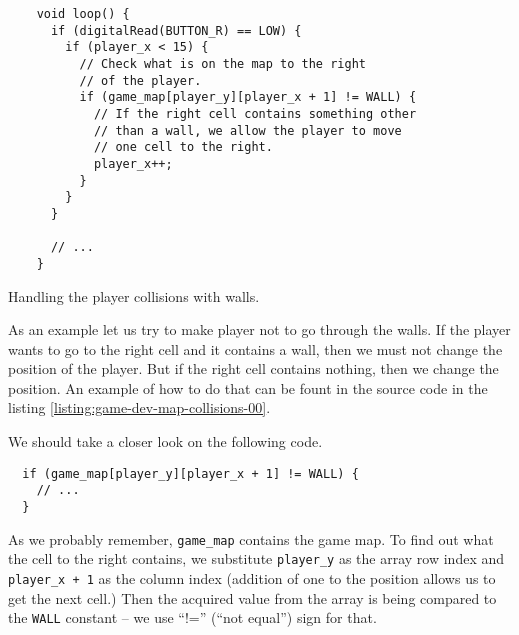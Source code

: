 \documentclass[../sparc.tex]{subfiles}
\begin{document}
\begin{listing}[H]
  \begin{verbatim}
    void loop() {
      if (digitalRead(BUTTON_R) == LOW) {
        if (player_x < 15) {
          // Check what is on the map to the right
          // of the player.
          if (game_map[player_y][player_x + 1] != WALL) {
            // If the right cell contains something other
            // than a wall, we allow the player to move
            // one cell to the right.
            player_x++;
          }
        }
      }

      // ...
    }
  \end{verbatim}
  \caption{Handling the player collisions with walls.}
  \label{listing:game-dev-map-collisions-00}
\end{listing}

As an example let us try to make player not to go through the walls.  If the
player wants to go to the right cell and it contains a wall, then we must not
change the position of the player.  But if the right cell contains nothing, then
we change the position.  An example of how to do that can be fount in the source
code in the listing \ref{listing:game-dev-map-collisions-00}.

We should take a closer look on the following code.

\begin{verbatim}
  if (game_map[player_y][player_x + 1] != WALL) {
    // ...
  }
\end{verbatim}

As we probably remember, \texttt{game_map} contains the game map.  To
find out what the cell to the right contains, we substitute
\texttt{player_y} as the array row index and \texttt{player_x
  + 1} as the column index (addition of one to the position allows us to get the
next cell.)  Then the acquired value from the array is being compared to the
\texttt{WALL} constant -- we use ``!='' (``not equal'') sign for that.
\end{document}
